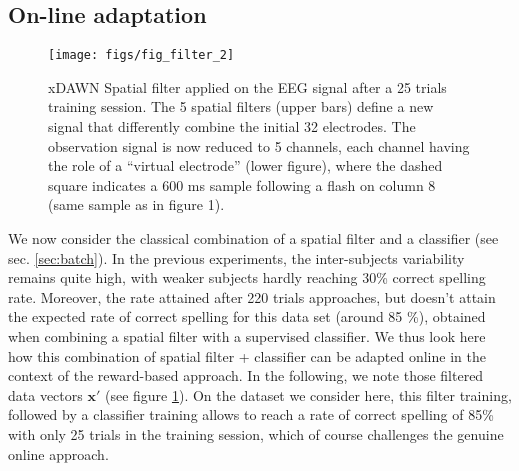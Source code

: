 \documentclass[conference]{IEEEtran}
\begin{document}

\subsection{On-line adaptation} \label{sec:sp_filt}

\begin{figure}
\centerline{
 \texttt{[image: figs/fig\_filter\_2]}
}
\caption{xDAWN Spatial filter applied on the EEG signal after a 25 trials training session. The 5 spatial filters (upper bars) define a new
signal that differently combine the initial 32 electrodes. The observation signal is now reduced to 5
channels, each channel having the role of a ``virtual electrode'' (lower figure), where the dashed square indicates 
a 600 ms sample following a flash on column 8 (same sample as in figure 1).}
\label{fig:filter}
\end{figure}

We now consider the classical combination of a spatial filter and a classifier (see sec. \ref{sec:batch}). %
In the previous experiments, the inter-subjects variability remains quite high, 
with weaker subjects hardly reaching 30\% correct spelling rate.
Moreover, the rate attained after 220 trials approaches, but doesn't attain the expected rate of correct spelling
for this data set (around 85 \%), obtained when combining a spatial filter with a
supervised classifier. 
We thus look here how this combination of spatial filter + classifier can be adapted
online in the context of the reward-based approach.
In the following, we note those 
filtered data vectors $\boldsymbol{x}'$ (see figure \ref{fig:filter}).
On the dataset we consider here, this filter training, followed by a classifier training 
allows to reach a rate of correct spelling of 85\% with only 25 trials in the 
training session, which of course challenges the genuine online approach.
\end{document}
